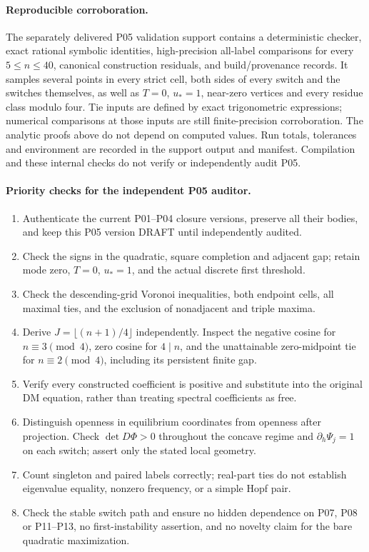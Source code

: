 \paragraph{Reproducible corroboration.}
The separately delivered P05 validation support contains a deterministic
checker, exact rational symbolic identities, high-precision all-label
comparisons for every $5\le n\le40$, canonical construction residuals,
and build/provenance records. It samples several points in every strict
cell, both sides of every switch and the switches themselves, as well as
$T=0$, $u_*=1$, near-zero vertices and every residue class modulo four.
Tie inputs are defined by exact trigonometric expressions; numerical
comparisons at those inputs are still finite-precision corroboration.
The analytic proofs above do not depend on computed values. Run totals,
tolerances and environment are recorded in the support output and manifest.
Compilation and these internal checks do not verify or independently audit P05.

\paragraph{Priority checks for the independent P05 auditor.}
\begin{enumerate}[label=(\arabic*),leftmargin=*]
\item Authenticate the current P01--P04 closure versions, preserve all their
bodies, and keep this P05 version DRAFT until independently audited.
\item Check the signs in the quadratic, square completion and adjacent gap;
retain mode zero, $T=0$, $u_*=1$, and the actual discrete first threshold.
\item Check the descending-grid Voronoi inequalities, both endpoint cells,
all maximal ties, and the exclusion of nonadjacent and triple maxima.
\item Derive $J=\lfloor(n+1)/4\rfloor$ independently. Inspect the negative
cosine for $n\equiv3\pmod4$, zero cosine for $4\mid n$, and the unattainable
zero-midpoint tie for $n\equiv2\pmod4$, including its persistent finite gap.
\item Verify every constructed coefficient is positive and substitute into
the original DM equation, rather than treating spectral coefficients as free.
\item Distinguish openness in equilibrium coordinates from openness after
projection. Check $\det D\Phi>0$ throughout the concave regime and
$\partial_h\Psi_j=1$ on each switch; assert only the stated local geometry.
\item Count singleton and paired labels correctly; real-part ties do not
establish eigenvalue equality, nonzero frequency, or a simple Hopf pair.
\item Check the stable switch path and ensure no hidden dependence on
P07, P08 or P11--P13, no first-instability assertion, and no novelty claim
for the bare quadratic maximization.
\end{enumerate}
